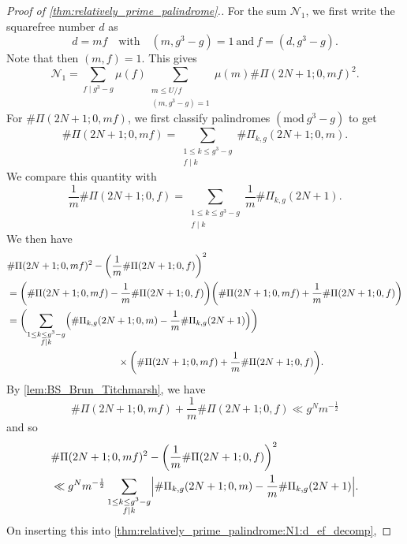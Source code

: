 \documentclass{amsart}
\theoremstyle{plain}
\theoremstyle{definition}
\renewcommand{\mod}[1]{(\mathrm{mod}\ #1)}
\begin{document}
\begin{proof}[Proof of \cref{thm:relatively_prime_palindrome}.]
For the sum $\mathscr{N}_{1}$, we first write the squarefree number $d$ as
\[
d=mf
\quad\text{with}\quad
(m,g^{3}-g)=1
\ \text{and}\ 
f=(d,g^{3}-g).
\]
Note that then $(m,f)=1$. This gives
\begin{equation}
\label{thm:relatively_prime_palindrome:N1:d_ef_decomp}
\mathscr{N}_{1}
=
\sum_{f\mid g^{3}-g}
\mu(f)
\sum_{\substack{
m\le U/f\\
(m,g^{3}-g)=1
}}
\mu(m)
\#\Pi(2N+1;0,mf)^{2}.
\end{equation}
For $\#\Pi(2N+1;0,mf)$, we first classify palindromes $\mod{g^{3}-g}$ to get
\begin{equation}
\label{thm:relatively_prime_palindrome:N1:g3_g_decomp}
\#\Pi(2N+1;0,mf)
=
\sum_{\substack{
1\le k\le g^{3}-g\\
f\mid k
}}
\#\Pi_{k,g}(2N+1;0,m).
\end{equation}
We compare this quantity with
\begin{equation}
\label{thm:relatively_prime_palindrome:N1:g3_g_decomp_counterpart}
\frac{1}{m}
\#\Pi(2N+1;0,f)
=
\sum_{\substack{
1\le k\le g^{3}-g\\
f\mid k
}}
\frac{1}{m}
\#\Pi_{k,g}(2N+1).
\end{equation}
We then have
\begin{align}
&\#\Pi(2N+1;0,mf)^{2}
-
\biggl(
\frac{1}{m}
\#\Pi(2N+1;0,f)
\biggr)^{2}\\
&=
\biggl(
\#\Pi(2N+1;0,mf)
-
\frac{1}{m}
\#\Pi(2N+1;0,f)
\biggr)
\biggl(
\#\Pi(2N+1;0,mf)
+
\frac{1}{m}
\#\Pi(2N+1;0,f)
\biggr)\\
&=
\biggl(
\sum_{\substack{
1\le k\le g^{3}-g\\
f\mid k
}}
\Bigl(
\#\Pi_{k,g}(2N+1;0,m)
-
\frac{1}{m}
\#\Pi_{k,g}(2N+1)\Bigr)\biggr)\\
&\hspace{40mm}
\times\biggl(
\#\Pi(2N+1;0,mf)
+
\frac{1}{m}
\#\Pi(2N+1;0,f)
\biggr).
\end{align}
By \cref{lem:BS_Brun_Titchmarsh}, we have
\[
\#\Pi(2N+1;0,mf)
+
\frac{1}{m}
\#\Pi(2N+1;0,f)
\ll
g^{N}m^{-\frac{1}{2}}
\]
and so
\begin{align}
&\#\Pi(2N+1;0,mf)^{2}
-
\biggl(
\frac{1}{m}
\#\Pi(2N+1;0,f)
\biggr)^{2}\\
&\ll
g^{N}m^{-\frac{1}{2}}
\sum_{\substack{
1\le k\le g^{3}-g\\
f\mid k
}}
\Bigl|
\#\Pi_{k,g}(2N+1;0,m)
-
\frac{1}{m}
\#\Pi_{k,g}(2N+1)
\Bigr|.
\end{align}
On inserting this into \cref{thm:relatively_prime_palindrome:N1:d_ef_decomp},

\end{proof}
\end{document}
